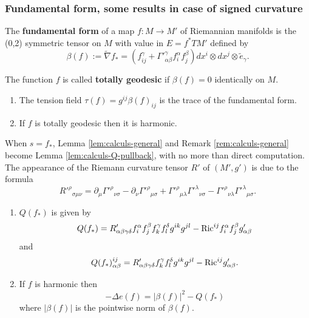 \subsubsection{Fundamental form, some results in case of signed curvature}
\label{sec:orgff5bc61}

\begin{definition}
The \textbf{fundamental form} of a map \(f: M \longrightarrow M'\) of Riemannian manifolds is
the (0,2) symmetric tensor on \(M\) with value in \(E=f^* TM'\) defined by
\[
 \beta(f):= \tilde \nabla f_* = \left(f^\gamma_{ij} + \Gamma'^\gamma_{\alpha\beta}
f^\alpha_i f^\beta_j\right) dx^i\otimes dx^j\otimes \tilde e_\gamma.
\]

The function \(f\) is called \textbf{totally geodesic} if \(\beta(f) = 0\) identically on \(M\).
\end{definition}

\begin{remark}
\begin{enumerate}
\item The tension field \(\tau(f) = g^{ij} \beta(f)_{ij}\) is the trace of the
fundamental form.
\item If \(f\) is totally geodesic then it is harmonic.
\end{enumerate}
\end{remark}

When \(s = f_*\), Lemma \ref{lem:calculs-general} and Remark \ref{rem:calculs-general}
become Lemma \ref{lem:calculs-Q-pullback}, with no more than direct computation. The appearance of the Riemann curvature
tensor \(R'\) of \((M',g')\) is due to the formula
\[ R'^\rho{}_{\sigma\mu\nu} = \partial_\mu\Gamma'^\rho{}_{\nu\sigma} -
\partial_\nu\Gamma'^\rho{}_{\mu\sigma} +
\Gamma'^\rho{}_{\mu\lambda}\Gamma'^\lambda{}_{\nu\sigma} -
\Gamma'^\rho{}_{\nu\lambda}\Gamma'^\lambda{}_{\mu\sigma}. \]

\begin{lemma}
\label{lem:calculs-Q-pullback}
\begin{enumerate}
\item \(Q(f_*)\) is given by
\[
   Q(f_*) = R'_{\alpha\beta\gamma\delta} f^\alpha_i f^\beta_j f^\gamma_k f^\delta_l
   g^{ik}g^{jl} - {\rm Ric}^{ij}f_i^\alpha f^\beta_j g'_{\alpha\beta}
   \]
and
\[
   Q(f_*)_{\alpha\beta}^{ij} = R'_{\alpha\beta\gamma\delta}f^\gamma_k f^\delta_l g^{ik}g^{jl}
   -{\rm Ric}^{ij}g'_{\alpha\beta}.
   \]
\item If \(f\) is harmonic then 
\[
    -\Delta e(f) = |\beta(f)|^2 - Q(f_*)
   \]
 where \(|\beta(f)|\) is the pointwise norm of \(\beta(f)\).
\end{enumerate}
\end{lemma}


